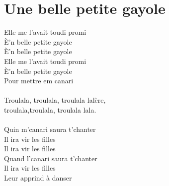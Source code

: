 \section*{Une belle petite gayole}
Elle me l'avait toudi promi\\
È'n belle petite gayole\\
È'n belle petite gayole\\
Elle me l'avait toudi promi\\
È'n belle petite gayole\\
Pour mettre em canari\\
\\
Troulala, troulala, troulala lalère,\\
troulala,troulala, troulala lala.\\
\\
Quin m'canari saura t'chanter\\
Il ira vir les filles\\
Il ira vir les filles\\
Quand l'canari saura t'chanter\\
Il ira vir les filles\\
Leur apprind à danser\\